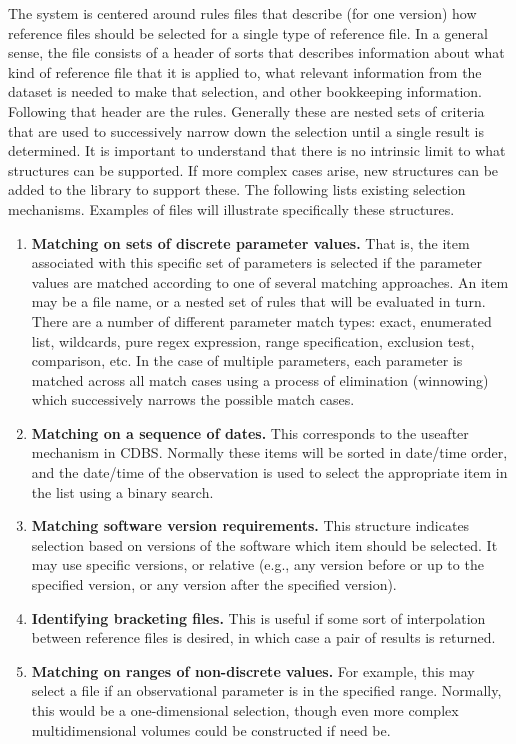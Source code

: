 \documentclass[final,authoryear,5p,times,twocolumn]{elsarticle}
\begin{document}
The system is centered around rules files that describe (for one version) 
how reference files should be selected for a single type of
reference file. In a general sense, the file consists of a header of sorts that
describes information about what kind of reference file that it is applied to,
what relevant information from the dataset is needed to make that
selection, and other bookkeeping information. Following that header are the
rules. Generally these are nested sets of criteria that are used to
successively narrow down the selection until a single result is determined. It
is important to understand that there is no intrinsic limit to what structures
can be supported. If more complex cases arise, new structures can be added to
the library to support these. The following lists existing selection mechanisms. 
Examples of files will illustrate specifically these structures.

\begin{enumerate}
\item \textbf{Matching on sets of discrete parameter values.}
That is, the item associated
with this specific set of parameters is selected if the parameter values are
matched according to one of several matching approaches. An item may be a file
name, or a nested set of rules that will be evaluated in turn.  
There are a number of different parameter match types: exact, enumerated
list, wildcards,
pure regex expression, range specification, exclusion test, comparison, etc.  
In the case of multiple parameters,
each parameter is matched across all match cases using a process of elimination
(winnowing) which successively narrows the possible match cases.

\item \textbf{Matching on a sequence of dates.}
This corresponds to the useafter mechanism
in CDBS. Normally these items will be sorted in date/time order, and the
date/time of the observation is used to select the appropriate item in the list
using a binary search.

\item \textbf{Matching software version requirements.} 
This structure indicates selection
based on versions of the software which item should be selected. It may use
specific versions, or relative (e.g., any version before or up to the specified
version, or any version after the specified version).

\item \textbf{Identifying bracketing files.}
This is useful if some sort of interpolation
between reference files is desired, in which case a pair of results is
returned.

\item \textbf{Matching on ranges of non-discrete values.}
For example, this may select a
file if an observational parameter is in the specified range. Normally, this
would be a one-dimensional selection, though even more complex multidimensional
volumes could be constructed if need be.
\end{enumerate}
\end{document}
